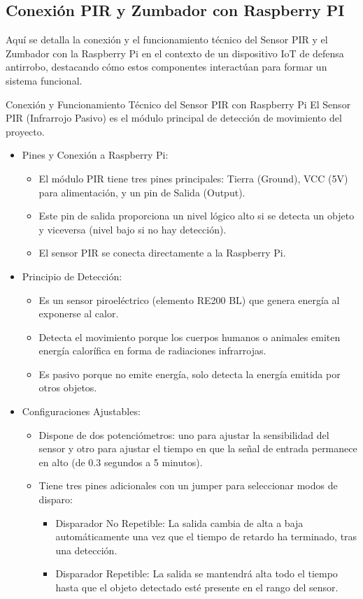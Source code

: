 \documentclass{report}
\begin{document}
\subsection{Conexión PIR y Zumbador con Raspberry PI}
Aquí se  detalla la conexión y el funcionamiento técnico del Sensor PIR y el Zumbador con la Raspberry Pi en el contexto de un dispositivo 
IoT de defensa antirrobo, destacando cómo estos componentes interactúan para formar un sistema funcional.

Conexión y Funcionamiento Técnico del Sensor PIR con Raspberry Pi
El Sensor PIR (Infrarrojo Pasivo) es el módulo principal de detección de movimiento del proyecto.
\begin{itemize}
    \item Pines y Conexión a Raspberry Pi:
    \begin{itemize}
        \item El módulo PIR tiene  tres pines principales: Tierra (Ground), VCC (5V) para alimentación, y un pin de Salida (Output).
        \item Este pin de salida proporciona un nivel lógico alto si se detecta un objeto y viceversa (nivel bajo si no hay detección).
        \item El sensor PIR se conecta directamente a la Raspberry Pi.
    \end{itemize}

    \item Principio de Detección:
    \begin{itemize}
        \item Es un sensor piroeléctrico (elemento RE200 BL) que genera energía al exponerse al calor.
        \item Detecta el movimiento porque los cuerpos humanos o animales emiten energía calorífica en forma de radiaciones infrarrojas.
        \item Es pasivo porque no emite energía, solo detecta la energía emitida por otros objetos.
    \end{itemize}

    \item Configuraciones Ajustables:
    \begin{itemize}
        \item Dispone de  dos potenciómetros: uno para ajustar la sensibilidad del sensor y otro para ajustar el tiempo en que la señal de entrada 
        permanece en alto (de 0.3 segundos a 5 minutos).
        \item Tiene tres pines adicionales con un jumper para seleccionar  modos de disparo:
        \begin{itemize}
            \item Disparador No Repetible: La salida cambia de alta a baja automáticamente una vez que el tiempo de retardo ha terminado, tras una detección.
            \item Disparador Repetible: La salida se mantendrá alta todo el tiempo hasta que el objeto detectado esté presente en el rango del sensor.
        \end{itemize}
    \end{itemize}


\end{itemize}
\end{document}
